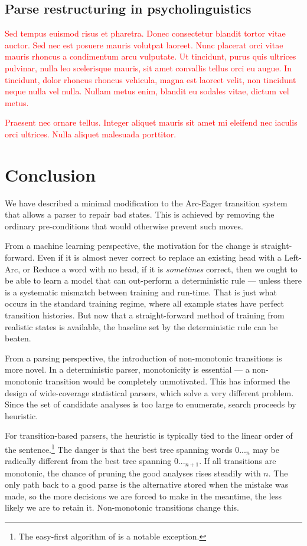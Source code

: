 \documentclass[11pt,letterpaper]{article}
\newcommand{\note}[1]{\textcolor{red}{#1}}
\begin{document}
\subsection{Parse restructuring in psycholinguistics}

\note{Sed tempus euismod risus et pharetra. Donec consectetur blandit tortor vitae auctor. Sed nec est posuere mauris volutpat laoreet. Nunc placerat orci vitae mauris rhoncus a condimentum arcu vulputate. Ut tincidunt, purus quis ultrices pulvinar, nulla leo scelerisque mauris, sit amet convallis tellus orci eu augue. In tincidunt, dolor rhoncus rhoncus vehicula, magna est laoreet velit, non tincidunt neque nulla vel nulla. Nullam metus enim, blandit eu sodales vitae, dictum vel metus.}

\note{Praesent nec ornare tellus. Integer aliquet mauris sit amet mi eleifend nec iaculis orci ultrices. Nulla aliquet malesuada porttitor.}


\section{Conclusion}

We have described a minimal modification to the Arc-Eager transition system that
allows a parser to repair bad states. This is achieved by removing the ordinary
pre-conditions that would otherwise prevent such moves.

From a machine learning perspective, the motivation for the change is straight-forward.
Even if it is almost never correct to replace an existing head with a Left-Arc,
or Reduce a word with no head, if it is \emph{sometimes} correct, then we ought to be
able to learn a model that can out-perform a deterministic rule ---
unless there is a systematic mismatch between training and run-time.
That is just what occurs in the standard training regime, where all
example states
have perfect transition histories. But now that a straight-forward method of training
from realistic states is available, the baseline set by the deterministic
rule can be beaten.

From a parsing perspective, the introduction of non-monotonic transitions is more novel.
In a deterministic parser, monotonicity is essential --- a non-monotonic transition
would be completely unmotivated. This has informed the design of wide-coverage
statistical parsers, which solve a very different problem. Since the set of candidate
analyses is too large to enumerate, search proceeds by heuristic.

For transition-based parsers, the heuristic is typically tied to the linear order
of the sentence.\footnote{The easy-first algorithm of \citet{goldberg:11} is a
notable exception.} The danger is that the best tree spanning words $0..._n$ may
be radically different from the best tree spanning $0..._{n+1}$.
If all transitions are monotonic, the chance of pruning the good analyses rises
steadily with $n$. The only path back to a good parse is the alternative stored
when the mistake was made, so the more decisions we are forced to make in the meantime,
the less likely we are to retain it. Non-monotonic transitions change this.
\end{document}
